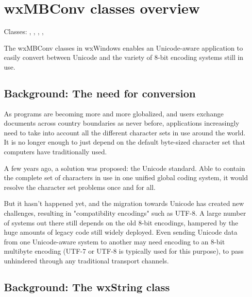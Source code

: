 
\section{wxMBConv classes overview}\label{mbconvclasses}

Classes: , , 
, , 

The wxMBConv classes in wxWindows enables an Unicode-aware application to
easily convert between Unicode and the variety of 8-bit encoding systems still
in use.

\subsection{Background: The need for conversion}

As programs are becoming more and more globalized, and users exchange documents
across country boundaries as never before, applications increasingly need to
take into account all the different character sets in use around the world. It
is no longer enough to just depend on the default byte-sized character set that
computers have traditionally used.

A few years ago, a solution was proposed: the Unicode standard. Able to contain
the complete set of characters in use in one unified global coding system,
it would resolve the character set problems once and for all.

But it hasn't happened yet, and the migration towards Unicode has created new
challenges, resulting in "compatibility encodings" such as UTF-8. A large
number of systems out there still depends on the old 8-bit encodings, hampered
by the huge amounts of legacy code still widely deployed. Even sending
Unicode data from one Unicode-aware system to another may need encoding to an
8-bit multibyte encoding (UTF-7 or UTF-8 is typically used for this purpose), to
pass unhindered through any traditional transport channels.

\subsection{Background: The wxString class}

